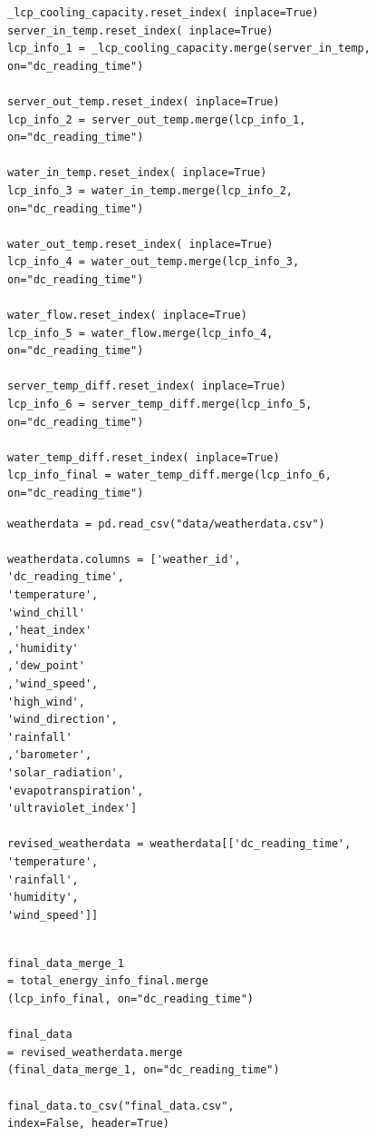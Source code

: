 \documentclass[12pt]{scrartcl}
\begin{document}
\begin{lstlisting}[frame=single,basicstyle=\footnotesize\ttfamily,
  caption={Python - Merge LCP Pivot Tables together},label={list:[Merge LCP Pivot Tables together]}]
_lcp_cooling_capacity.reset_index( inplace=True)
server_in_temp.reset_index( inplace=True)
lcp_info_1 = _lcp_cooling_capacity.merge(server_in_temp, 
on="dc_reading_time")

server_out_temp.reset_index( inplace=True)
lcp_info_2 = server_out_temp.merge(lcp_info_1, 
on="dc_reading_time")

water_in_temp.reset_index( inplace=True)
lcp_info_3 = water_in_temp.merge(lcp_info_2, 
on="dc_reading_time")

water_out_temp.reset_index( inplace=True)
lcp_info_4 = water_out_temp.merge(lcp_info_3, 
on="dc_reading_time")

water_flow.reset_index( inplace=True)
lcp_info_5 = water_flow.merge(lcp_info_4, 
on="dc_reading_time")

server_temp_diff.reset_index( inplace=True)
lcp_info_6 = server_temp_diff.merge(lcp_info_5, 
on="dc_reading_time")

water_temp_diff.reset_index( inplace=True)
lcp_info_final = water_temp_diff.merge(lcp_info_6, 
on="dc_reading_time")

\end{lstlisting}

\begin{lstlisting}[frame=single,basicstyle=\footnotesize\ttfamily,
  caption={Python - Import and Merge Weather Data},label={list:[Import and Merge Weather Data]}]
weatherdata = pd.read_csv("data/weatherdata.csv")

weatherdata.columns = ['weather_id',
'dc_reading_time',
'temperature',
'wind_chill'
,'heat_index'
,'humidity'
,'dew_point'
,'wind_speed',
'high_wind',
'wind_direction',
'rainfall'
,'barometer',
'solar_radiation',
'evapotranspiration',
'ultraviolet_index']

revised_weatherdata = weatherdata[['dc_reading_time',
'temperature',
'rainfall',
'humidity',
'wind_speed']]


\end{lstlisting}

\begin{lstlisting}[frame=single,basicstyle=\footnotesize\ttfamily,
  caption={Python - Merge all Data Together into one table},label={list:[Merge all Data Together into one table]}]
final_data_merge_1 
= total_energy_info_final.merge
(lcp_info_final, on="dc_reading_time")

final_data 
= revised_weatherdata.merge
(final_data_merge_1, on="dc_reading_time")

final_data.to_csv("final_data.csv", 
index=False, header=True)


\end{lstlisting}
\end{document}
